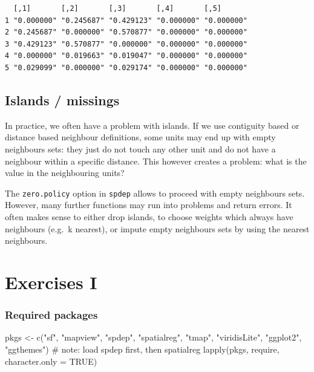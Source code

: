 \documentclass[
  letterpaper,
  DIV=11,
  numbers=noendperiod]{scrreprt}
\newenvironment{Shaded}{\begin{snugshade}}{\end{snugshade}}
\newcommand{\AttributeTok}[1]{\textcolor[rgb]{0.40,0.45,0.13}{#1}}
\newcommand{\CommentTok}[1]{\textcolor[rgb]{0.37,0.37,0.37}{#1}}
\newcommand{\ConstantTok}[1]{\textcolor[rgb]{0.56,0.35,0.01}{#1}}
\newcommand{\FunctionTok}[1]{\textcolor[rgb]{0.28,0.35,0.67}{#1}}
\newcommand{\NormalTok}[1]{\textcolor[rgb]{0.00,0.23,0.31}{#1}}
\newcommand{\OtherTok}[1]{\textcolor[rgb]{0.00,0.23,0.31}{#1}}
\newcommand{\StringTok}[1]{\textcolor[rgb]{0.13,0.47,0.30}{#1}}
\begin{document}
\begin{verbatim}
  [,1]       [,2]       [,3]       [,4]       [,5]      
1 "0.000000" "0.245687" "0.429123" "0.000000" "0.000000"
2 "0.245687" "0.000000" "0.570877" "0.000000" "0.000000"
3 "0.429123" "0.570877" "0.000000" "0.000000" "0.000000"
4 "0.000000" "0.019663" "0.019047" "0.000000" "0.000000"
5 "0.029099" "0.000000" "0.029174" "0.000000" "0.000000"
\end{verbatim}

\hypertarget{islands-missings}{%
\section{Islands / missings}\label{islands-missings}}

In practice, we often have a problem with islands. If we use contiguity
based or distance based neighbour definitions, some units may end up
with empty neighbours sets: they just do not touch any other unit and do
not have a neighbour within a specific distance. This however creates a
problem: what is the value in the neighbouring units?

The \texttt{zero.policy} option in \texttt{spdep} allows to proceed with
empty neighbours sets. However, many further functions may run into
problems and return errors. It often makes sense to either drop islands,
to choose weights which always have neighbours (e.g.~k nearest), or
impute empty neighbours sets by using the nearest neighbours.


\hypertarget{exercises-i}{%
\chapter{Exercises I}\label{exercises-i}}

\hypertarget{required-packages-3}{%
\subsection*{Required packages}\label{required-packages-3}}

\begin{Shaded}
\begin{Highlighting}[]
\NormalTok{pkgs }\OtherTok{\textless{}{-}} \FunctionTok{c}\NormalTok{(}\StringTok{"sf"}\NormalTok{, }\StringTok{"mapview"}\NormalTok{, }\StringTok{"spdep"}\NormalTok{, }\StringTok{"spatialreg"}\NormalTok{, }\StringTok{"tmap"}\NormalTok{, }\StringTok{"viridisLite"}\NormalTok{,}
          \StringTok{"ggplot2"}\NormalTok{, }\StringTok{"ggthemes"}\NormalTok{) }\CommentTok{\# note: load spdep first, then spatialreg}
\FunctionTok{lapply}\NormalTok{(pkgs, require, }\AttributeTok{character.only =} \ConstantTok{TRUE}\NormalTok{)}
\end{Highlighting}
\end{Shaded}
\end{document}
